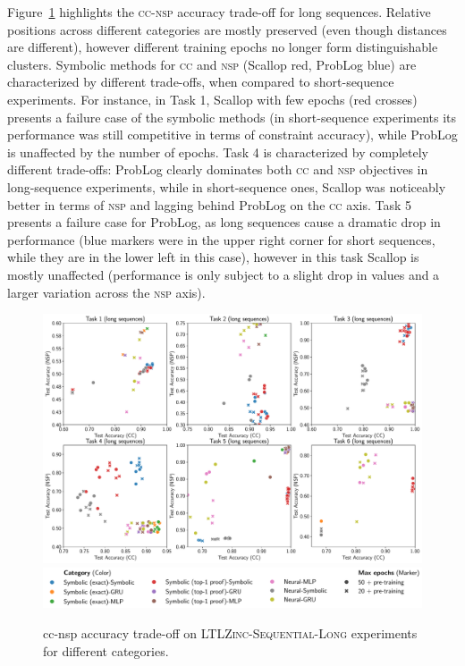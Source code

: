%
Figure~\ref{ltlzinc:fig:sequential-tradeoff-long} highlights the \textsc{cc}-\textsc{nsp} accuracy trade-off for long sequences. Relative positions across different categories are mostly preserved (even though distances are different), however different training epochs no longer form distinguishable clusters. Symbolic methods for \textsc{cc} and \textsc{nsp} (Scallop red, ProbLog blue) are characterized by different trade-offs, when compared to short-sequence experiments.
For instance, in Task 1, Scallop with few epochs (red crosses) presents a failure case of the symbolic methods (in short-sequence experiments its performance was still competitive in terms of constraint accuracy), while ProbLog is unaffected by the number of epochs. Task 4 is characterized by completely different trade-offs: ProbLog clearly dominates both \textsc{cc} and \textsc{nsp} objectives in long-sequence experiments, while in short-sequence ones, Scallop was noticeably better in terms of \textsc{nsp} and lagging behind ProbLog on the \textsc{cc} axis.
Task 5 presents a failure case for ProbLog, as long sequences cause a dramatic drop in performance (blue markers were in the upper right corner for short sequences, while they are in the lower left in this case), however in this task Scallop is mostly unaffected (performance is only subject to a slight drop in values and a larger variation across the \textsc{nsp} axis).
\begin{figure}
\centering
\includegraphics[width=1.0\textwidth]{imgs/ltlzinc/const-vs-succ-long.pdf}
\includegraphics[width=1.0\textwidth]{imgs/ltlzinc/const-vs-succ_legend.pdf}
\caption[\textsc{cc}--\textsc{nsp} accuracy-trade-off on \textsc{LTLZinc-Sequential-Long}]{{\sc cc}-{\sc nsp} accuracy trade-off on \textsc{LTLZinc-Sequential-Long} experiments for different categories.} %
\label{ltlzinc:fig:sequential-tradeoff-long}
\end{figure}